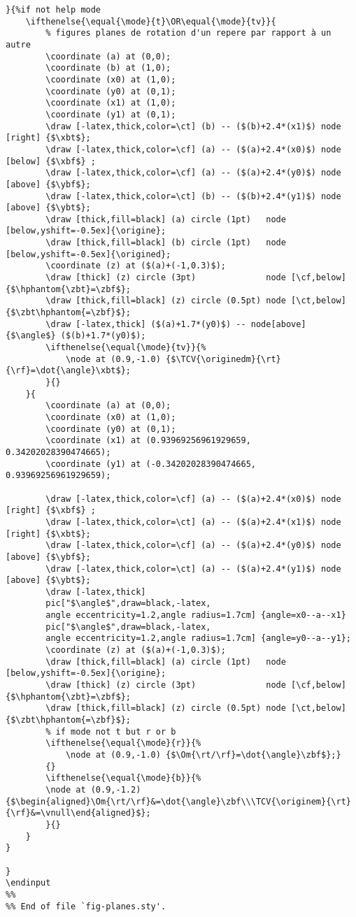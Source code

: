 \documentclass[a4paper,9pt]{article}
\begin{document}
\begin{verbatim}
}{%if not help mode
    \ifthenelse{\equal{\mode}{t}\OR\equal{\mode}{tv}}{
        % figures planes de rotation d'un repere par rapport à un autre
        \coordinate (a) at (0,0);
        \coordinate (b) at (1,0);
        \coordinate (x0) at (1,0);
        \coordinate (y0) at (0,1);
        \coordinate (x1) at (1,0);
        \coordinate (y1) at (0,1);
        \draw [-latex,thick,color=\ct] (b) -- ($(b)+2.4*(x1)$) node [right] {$\xbt$};
        \draw [-latex,thick,color=\cf] (a) -- ($(a)+2.4*(x0)$) node [below] {$\xbf$} ;
        \draw [-latex,thick,color=\cf] (a) -- ($(a)+2.4*(y0)$) node [above] {$\ybf$};
        \draw [-latex,thick,color=\ct] (b) -- ($(b)+2.4*(y1)$) node [above] {$\ybt$};
        \draw [thick,fill=black] (a) circle (1pt)   node [below,yshift=-0.5ex]{\origine};
        \draw [thick,fill=black] (b) circle (1pt)   node [below,yshift=-0.5ex]{\origined};
        \coordinate (z) at ($(a)+(-1,0.3)$);
        \draw [thick] (z) circle (3pt)              node [\cf,below] {$\hphantom{\zbt}=\zbf$};
        \draw [thick,fill=black] (z) circle (0.5pt) node [\ct,below] {$\zbt\hphantom{=\zbf}$};
        \draw [-latex,thick] ($(a)+1.7*(y0)$) -- node[above] {$\angle$} ($(b)+1.7*(y0)$);
        \ifthenelse{\equal{\mode}{tv}}{%
            \node at (0.9,-1.0) {$\TCV{\originedm}{\rt}{\rf}=\dot{\angle}\xbt$};
        }{}
    }{
        \coordinate (a) at (0,0);
        \coordinate (x0) at (1,0);
        \coordinate (y0) at (0,1);
        \coordinate (x1) at (0.93969256961929659, 0.34202028390474665);
        \coordinate (y1) at (-0.34202028390474665, 0.93969256961929659);

        \draw [-latex,thick,color=\cf] (a) -- ($(a)+2.4*(x0)$) node [right] {$\xbf$} ;
        \draw [-latex,thick,color=\ct] (a) -- ($(a)+2.4*(x1)$) node [right] {$\xbt$};
        \draw [-latex,thick,color=\cf] (a) -- ($(a)+2.4*(y0)$) node [above] {$\ybf$};
        \draw [-latex,thick,color=\ct] (a) -- ($(a)+2.4*(y1)$) node [above] {$\ybt$};
        \draw [-latex,thick] 
        pic["$\angle$",draw=black,-latex,
        angle eccentricity=1.2,angle radius=1.7cm] {angle=x0--a--x1}
        pic["$\angle$",draw=black,-latex,
        angle eccentricity=1.2,angle radius=1.7cm] {angle=y0--a--y1};
        \coordinate (z) at ($(a)+(-1,0.3)$);
        \draw [thick,fill=black] (a) circle (1pt)   node [below,yshift=-0.5ex]{\origine};
        \draw [thick] (z) circle (3pt)              node [\cf,below] {$\hphantom{\zbt}=\zbf$};
        \draw [thick,fill=black] (z) circle (0.5pt) node [\ct,below] {$\zbt\hphantom{=\zbf}$};
        % if mode not t but r or b
        \ifthenelse{\equal{\mode}{r}}{%
            \node at (0.9,-1.0) {$\Om{\rt/\rf}=\dot{\angle}\zbf$};}
        {}
        \ifthenelse{\equal{\mode}{b}}{%
        \node at (0.9,-1.2) {$\begin{aligned}\Om{\rt/\rf}&=\dot{\angle}\zbf\\\TCV{\originem}{\rt}{\rf}&=\vnull\end{aligned}$};
        }{}
    }
}

}
\endinput
%%
%% End of file `fig-planes.sty'.
\end{verbatim}
\end{document}
